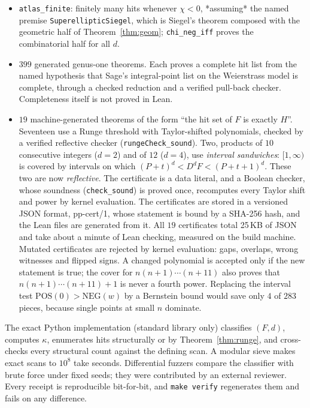\documentclass[11pt]{amsart}
\theoremstyle{definition}
\theoremstyle{remark}
\newcommand{\lean}[1]{\texttt{#1}}
\begin{document}
\begin{itemize}
\item \lean{atlas\_finite}: finitely many hits whenever $\chi<0$, *assuming* the named premise \lean{SuperellipticSiegel}, which is Siegel's theorem composed with the geometric half of Theorem~\ref{thm:geom}; \lean{chi\_neg\_iff} proves the combinatorial half for all $d$.
\item $399$ generated genus-one theorems. Each proves a complete hit list from the named hypothesis that Sage's integral-point list on the Weierstrass model is complete, through a checked reduction and a verified pull-back checker. Completeness itself is not proved in Lean.
\item $19$ machine-generated theorems of the form ``the hit set of $F$ is exactly $H$''. Seventeen use a Runge threshold with Taylor-shifted polynomials, checked by a verified reflective checker (\lean{rungeCheck\_sound}). Two, products of $10$ consecutive integers ($d=2$) and of $12$ ($d=4$), use \emph{interval sandwiches}: $[1,\infty)$ is covered by intervals on which $(P+t)^d<D^dF<(P+t+1)^d$. These two are now \emph{reflective}. The certificate is a data literal, and a Boolean checker, whose soundness (\lean{check\_sound}) is proved once, recomputes every Taylor shift and power by kernel evaluation. The certificates are stored in a versioned JSON format, pp-cert/1, whose statement is bound by a SHA-256 hash, and the Lean files are generated from it. All $19$ certificates total 25\,KB of JSON and take about a minute of Lean checking, measured on the build machine. Mutated certificates are rejected by kernel evaluation: gaps, overlaps, wrong witnesses and flipped signs. A changed polynomial is accepted only if the new statement is true; the cover for $n(n+1)\cdots(n+11)$ also proves that $n(n+1)\cdots(n+11)+1$ is never a fourth power. Replacing the interval test $\mathrm{POS}(0)>\mathrm{NEG}(w)$ by a Bernstein bound would save only $4$ of $283$ pieces, because single points at small $n$ dominate.
\end{itemize}
The exact Python implementation (standard library only) classifies $(F,d)$, computes $\kappa$, enumerates hits structurally or by Theorem~\ref{thm:runge}, and cross-checks every structural count against the defining scan. A modular sieve makes exact scans to $10^8$ take seconds. Differential fuzzers compare the classifier with brute force under fixed seeds; they were contributed by an external reviewer. Every receipt is reproducible bit-for-bit, and \texttt{make verify} regenerates them and fails on any difference.
\end{document}

